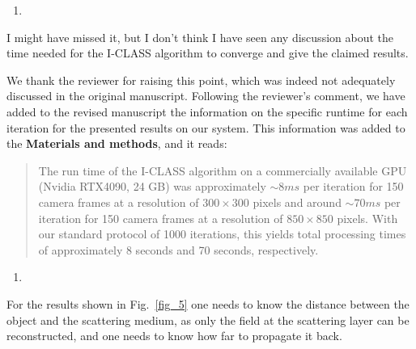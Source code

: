 \documentclass[12pt]{article}
\newenvironment{solved_reviewercomment}
    {\begin{tcolorbox}[width=\linewidth,colback=gray!5,colframe=solved_commentcolor!50,title=Reviewer Comment,left=5pt,right=5pt]}
    {\end{tcolorbox}}
\newenvironment{finished_ourresponse}
    {\begin{tcolorbox}[width=\linewidth,breakable,enhanced,colback=gray!5,colframe=finished_responsecolor!50,title=Response,left=5pt,right=5pt]}
    {\end{tcolorbox}}
\begin{document}
\begin{enumerate}[label=\arabic*., resume]
\item \leavevmode
\end{enumerate}
\vspace{-1em}
\begin{solved_reviewercomment}
I might have missed it, but I don't think I have seen any discussion about the time needed for the I-CLASS algorithm to converge and give the claimed results.
\end{solved_reviewercomment}
\begin{finished_ourresponse}
We thank the reviewer for raising this point, which was indeed not adequately discussed in the original manuscript. Following the reviewer's comment, we have added to the revised manuscript the information on the specific runtime for each iteration for the presented results on our system. This information was added to the \textbf{Materials and methods}, and it reads:

\begin{quote}
    The run time of the I-CLASS algorithm on a commercially available GPU (Nvidia RTX4090, 24 GB) was approximately $\sim 8ms$ per iteration for 150 camera frames at a resolution of $300 \times 300$ pixels and around $\sim 70ms$ per iteration for 150 camera frames at a resolution of $850 \times 850$ pixels. With our standard protocol of 1000 iterations, this yields total processing times of approximately 8 seconds and 70 seconds, respectively.
\end{quote}
\end{finished_ourresponse}



        
\begin{enumerate}[label=\arabic*., resume]
\item \leavevmode
\end{enumerate}
\vspace{-1em}
\begin{solved_reviewercomment}
    For the results shown in Fig.~\ref{fig_5} one needs to know the distance between the object and the scattering medium, as only the field at the scattering layer can be reconstructed, and one needs to know how far to propagate it back.
\end{solved_reviewercomment}
\end{document}
